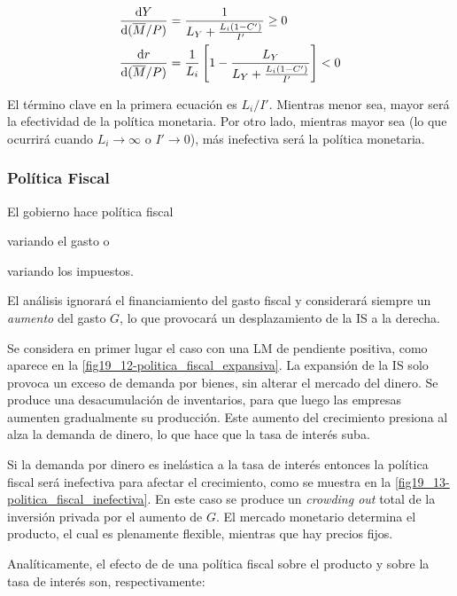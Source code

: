 \documentclass[DeGregorioResumen]{subfiles}
\begin{document}
\begin{align*}
\frac{\mathrm{d}Y}{\mathrm{d}(\overline M/P)} &= \frac{1}{L_Y + \frac{L_i(1-C')}{I'}}  \geq 0 \\
\frac{\mathrm{d}r}{\mathrm{d}(\overline M/P)} &= \frac{1}{L_i} \left [1-\frac{L_Y}{L_Y + \frac{L_i(1-C')}{I'}} \right ]  < 0 
\end{align*}

El término clave en la primera ecuación es $L_i/I'$. Mientras menor sea, mayor será la efectividad de la política monetaria. Por otro lado, mientras mayor sea (lo que ocurrirá cuando $L_i \rightarrow \infty$ o $I' \rightarrow 0$), más inefectiva será la política monetaria.

\subsubsection{Política Fiscal}

El gobierno hace política fiscal \begin{enumerate*}[label=(\roman*)]
\item variando el gasto o
\item variando los impuestos.
\end{enumerate*}
El análisis ignorará el financiamiento del gasto fiscal y considerará siempre un \emph{aumento} del gasto $G$, lo que provocará un desplazamiento de la IS a la derecha.

Se considera en primer lugar el caso con una LM de pendiente positiva, como aparece en la \autoref{fig19_12-politica_fiscal_expansiva}. La expansión de la IS solo provoca un exceso de demanda por bienes, sin alterar el mercado del dinero. Se produce una desacumulación de inventarios, para que luego las empresas aumenten gradualmente su producción. Este aumento del crecimiento presiona al alza la demanda de dinero, lo que hace que la tasa de interés suba.



Si la demanda por dinero es inelástica a la tasa de interés entonces la política fiscal será inefectiva para afectar el crecimiento, como se muestra en la \autoref{fig19_13-politica_fiscal_inefectiva}.  En este caso se produce un \textit{crowding out} total de la inversión privada por el aumento de $G$. El mercado monetario determina el producto, el cual es plenamente flexible, mientras que hay precios fijos.

Analíticamente, el efecto de de una política fiscal sobre el producto y sobre la tasa de interés son, respectivamente:
\end{document}
